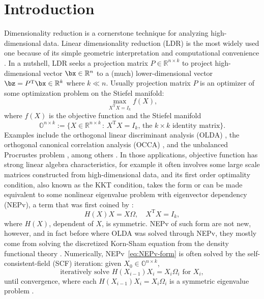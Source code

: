 \documentclass[11pt]{article}
\def\bbO{\mathbb{O}}
\def\bbR{\mathbb{R}}
\DeclareMathOperator{\T}{T}
\theoremstyle{definition}
\numberwithin{equation}{section}
\numberwithin{figure}{section}
\numberwithin{table}{section}
\begin{document}
\section{Introduction}\label{sec:intro}
\iffalse
Dimensionality reduction is a cornerstone technique for analyzing high-dimensional data.
Linear dimensionality reduction (LDR) is the most widely used one because of its simple geometric interpretation and
computational convenience \cite{cugh:2015}. In a nutshell, LDR
seeks a projection matrix $P\in\bbR^{n\times k}$ to project high-dimensional vector
$\bx\in\bbR^n$ to a (much) lower-dimensional vector $\bz=P^{\T}\bx\in\bbR^k$ where  $k\ll n$. Usually projection matrix $P$
is an optimizer of some optimization problem on the Stiefel manifold:
\begin{equation}\label{eq:OptSTM}
\max_{X^{\T}X=I_k} f(X),
\end{equation}
where $f(X)$ is the objective function and the Stiefel manifold
$$
\bbO^{n\times k}:=\{X\in\bbR^{n\times k}\,:\, X^{\T}X=I_k,\,\mbox{the $k\times k$ identity matrix}\}.
$$
Examples include
the orthogonal linear discriminant analysis (OLDA) \cite{ngbs:2010,zhln:2010,zhln:2013},
the orthogonal canonical correlation analysis (OCCA) \cite{zhwb:2022},
and the unbalanced Procrustes problem \cite{chtr:2001,edas:1999,elpa:1999,godi:2004,huca:1962,zhys:2020,zhdu:2006},
among others \cite{ball:2022,wazl:2022,wazl:2022a,zhys:2020}. In those applications, objective function has strong
linear algebra characteristics, for example it often involves some large scale matrices constructed from
high-dimensional data, and its first order optimality condition, also known as the KKT condition, takes the form or can be made equivalent to
some nonlinear eigenvalue problem with eigenvector dependency (NEPv), a term that was first coined by \cite{cazb:2018}:
\begin{equation}\label{eq:NEPv-form}
H(X)X=X\Omega,\quad X^{\T}X=I_k,
\end{equation}
where $H(X)$, dependent of $X$, is symmetric. NEPv of such form are not new, however, and in fact before
\cite{zhln:2010,zhln:2013} where OLDA was solved through NEPv, they mostly come from solving the discretized
Korn-Sham equation from the density functional theory \cite{hoko:64,kosh:1965,robl:2012,yaml:2009}.
Numerically, NEPv~\ref{eq:NEPv-form} is often solved by the self-consistent-field (SCF) iteration:
given $X_0\in\bbO^{n\times k}$,
\begin{equation}\label{eq:SCF0}
\mbox{iteratively solve $H(X_{i-1})X_i=X_i\Omega_i$ for $X_i$},
\end{equation}
until convergence, where each $H(X_{i-1})X_i=X_i\Omega_i$ is a symmetric eigenvalue problem \cite{parl:1998}.
\end{document}
